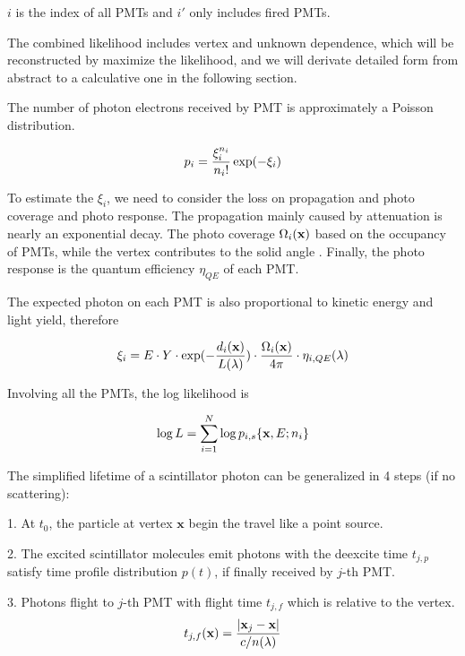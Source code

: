 \documentclass{article}
\begin{document}
	\par $i$ is the index of all PMTs and $i'$ only includes fired PMTs.   
	\par The combined likelihood includes vertex and unknown dependence, which will be reconstructed by maximize the likelihood, and we will derivate detailed form from abstract to a calculative one in the following section.


\par The number of photon electrons received by PMT is approximately a Poisson distribution.
	
	\begin{equation}
	\numberwithin{equation}{section}
	p_i = \frac{\xi_i^{n_i}}{n_i!} \exp(-\xi_i)
	\end{equation}
	
	\par To estimate the $\xi_i$, we need to consider the loss on propagation and photo coverage and photo response. The propagation mainly caused by attenuation is nearly an exponential decay. The photo coverage $\Omega_i(\textbf x)$ based on the occupancy of PMTs, while the vertex contributes to the solid angle . Finally, the photo response is the quantum efficiency $\eta_{QE}$ of each PMT.
	
	\par The expected photon on each PMT is also proportional to kinetic energy and light yield, therefore
	
	\begin{equation}
	\numberwithin{equation}{section}
	\xi_i = E\cdot Y\cdot \exp(-\frac{d_i({\textbf x})}{L(\lambda)}) \cdot \frac{\Omega_i({\textbf x})}{4\pi} \cdot\eta_{i,QE}(\lambda)
	\end{equation}

	\par Involving all the PMTs, the log likelihood is
	
	\begin{equation}
	\numberwithin{equation}{section}
	\log L = \sum_{i=1}^N \log p_{i,s} \{{\textbf x},E;n_{i}\}
	\end{equation}

	\par The simplified lifetime of a scintillator photon can be generalized in 4 steps (if no scattering): 
	\par 1. At $t_0$, the particle at vertex $\textbf {x}$ begin the travel like a point source. 
	\par 2. The excited scintillator molecules emit photons with the deexcite time $t_{j,p}$ satisfy time profile distribution $p(t)$, if finally received by $j$-th PMT.
	\par 3. Photons flight to $j$-th PMT with flight time $t_{j,f}$ which is relative to the vertex.
	\begin{equation}
		\numberwithin{equation}{section}
		t_{j,f}(\textbf x)=\frac{{|\textbf x_j}-{\textbf x|}}{c/n(\lambda)}
	\end{equation}
	
\end{document}
